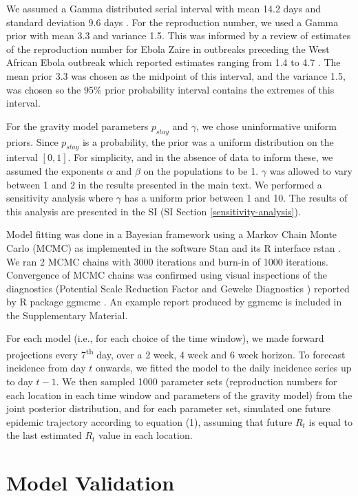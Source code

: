 \documentclass[9pt,twocolumn,twoside,lineno]{pnas-new}
\begin{document}
{We assumed a Gamma distributed serial interval with mean 14.2 days and
standard deviation 9.6 days \cite{team2015west}. For the reproduction
number, we used a Gamma prior with mean 3.3 and variance 1.5. This was
informed by a review of estimates of the reproduction number for Ebola
Zaire in outbreaks preceding the West African Ebola outbreak which
reported estimates ranging from 1.4 to 4.7 \cite{van2015review}. The
mean prior 3.3 was chosen as the midpoint of this interval, and the
variance 1.5, was chosen so the 95\% prior probability interval contains
the extremes of this interval.

For the gravity model parameters \(p_{stay}\) and \(\gamma\), we chose
uninformative uniform priors. Since \(p_{stay}\) is a probability, the
prior was a uniform distribution on the interval \([0, 1]\). For
simplicity, and in the absence of data to inform these, we assumed the
exponents \(\alpha\) and \(\beta\) on the populations to be 1.
\(\gamma\) was allowed to vary between 1 and 2 in the results presented
in the main text. We performed a sensitivity analysis where \(\gamma\)
has a uniform prior between 1 and 10. The results of this analysis are
presented in the SI (SI Section \ref{sensitivity-analysis}).

Model fitting was done in a Bayesian framework using a Markov Chain
Monte Carlo (MCMC) as implemented in the software Stan
\cite{carpenter2017stan} and its R interface rstan \cite{rstan}. We ran
2 MCMC chains with 3000 iterations and burn-in of 1000 iterations.
Convergence of MCMC chains was confirmed using visual inspections of the
diagnostics (Potential Scale Reduction Factor \cite{gelman1992inference}
and Geweke Diagnostics \cite{geweke}) reported by R package ggmcmc
\cite{ggmcmc}. An example report produced by ggmcmc is included in the
Supplementary Material.

For each model (i.e., for each choice of the time window), we made
forward projections every 7\textsuperscript{th} day, over a 2 week, 4
week and 6 week horizon. To forecast incidence from day \(t\) onwards,
we fitted the model to the daily incidence series up to day \(t-1\). We
then sampled 1000 parameter sets (reproduction numbers for each location
in each time window and parameters of the gravity model) from the joint
posterior distribution, and for each parameter set, simulated one future
epidemic trajectory according to equation (1), assuming that future
\(R_t\) is equal to the last estimated \(R_t\) value in each location.

\section*{Model Validation}\label{assess}

}
\end{document}
